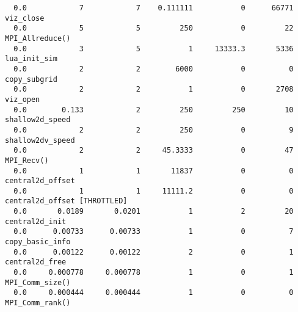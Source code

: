 \documentclass{article}
\begin{document}
{\begin{verbatim}
  0.0            7            7    0.111111           0      66771 viz_close 
  0.0            5            5         250           0         22 MPI_Allreduce() 
  0.0            3            5           1     13333.3       5336 lua_init_sim 
  0.0            2            2        6000           0          0 copy_subgrid 
  0.0            2            2           1           0       2708 viz_open 
  0.0        0.133            2         250         250         10 shallow2d_speed 
  0.0            2            2         250           0          9 shallow2dv_speed 
  0.0            2            2     45.3333           0         47 MPI_Recv() 
  0.0            1            1       11837           0          0 central2d_offset 
  0.0            1            1     11111.2           0          0 central2d_offset [THROTTLED]
  0.0       0.0189       0.0201           1           2         20 central2d_init 
  0.0      0.00733      0.00733           1           0          7 copy_basic_info 
  0.0      0.00122      0.00122           2           0          1 central2d_free 
  0.0     0.000778     0.000778           1           0          1 MPI_Comm_size() 
  0.0     0.000444     0.000444           1           0          0 MPI_Comm_rank() 
\end{verbatim}
}
\end{document}
